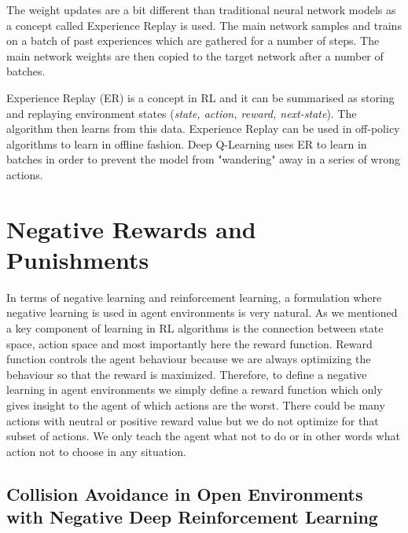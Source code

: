 \documentclass[b5paper]{book}
\begin{document}
The weight updates are a bit different than traditional neural network models as a concept called Experience Replay is used. The main network samples and trains on a batch of past experiences which are gathered for a number of steps. The main network weights are then copied to the target network after a number of batches.

Experience Replay (ER) is a concept in RL and it can be summarised as storing and replaying environment states (\emph{state, action, reward, next-state}). The algorithm then learns from this data. Experience Replay can be used in off-policy algorithms to learn in offline fashion. Deep Q-Learning uses ER to learn in batches in order to prevent the model from "wandering" away in a series of wrong actions.

\section{Negative Rewards and Punishments}

In terms of negative learning and reinforcement learning, a formulation where negative learning is used in agent environments is very natural. As we mentioned a key component of learning in RL algorithms is the connection between state space, action space and most importantly here the reward function. Reward function controls the agent behaviour because we are always optimizing the behaviour so that the reward is maximized. Therefore, to define a negative learning in agent environments we simply define a reward function which only gives insight to the agent of which actions are the worst. There could be many actions with neutral or positive reward value but we do not optimize for that subset of actions. We only teach the agent what not to do or in other words what action not to choose in any situation.

\subsection{Collision Avoidance in Open Environments with Negative Deep Reinforcement Learning}
\end{document}
